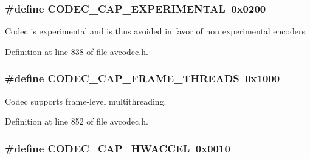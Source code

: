 \subsubsection[{\texorpdfstring{C\+O\+D\+E\+C\+\_\+\+C\+A\+P\+\_\+\+E\+X\+P\+E\+R\+I\+M\+E\+N\+T\+AL}{CODEC_CAP_EXPERIMENTAL}}]{\setlength{\rightskip}{0pt plus 5cm}\#define C\+O\+D\+E\+C\+\_\+\+C\+A\+P\+\_\+\+E\+X\+P\+E\+R\+I\+M\+E\+N\+T\+AL~0x0200}\hypertarget{group__lavc__core_ga4d8340893edcdf15fc859f8c6291db1e}{}\label{group__lavc__core_ga4d8340893edcdf15fc859f8c6291db1e}
Codec is experimental and is thus avoided in favor of non experimental encoders 

Definition at line 838 of file avcodec.\+h.

\subsubsection[{\texorpdfstring{C\+O\+D\+E\+C\+\_\+\+C\+A\+P\+\_\+\+F\+R\+A\+M\+E\+\_\+\+T\+H\+R\+E\+A\+DS}{CODEC_CAP_FRAME_THREADS}}]{\setlength{\rightskip}{0pt plus 5cm}\#define C\+O\+D\+E\+C\+\_\+\+C\+A\+P\+\_\+\+F\+R\+A\+M\+E\+\_\+\+T\+H\+R\+E\+A\+DS~0x1000}\hypertarget{group__lavc__core_gaf7d97232f50d2c3aeb4bde978407f2da}{}\label{group__lavc__core_gaf7d97232f50d2c3aeb4bde978407f2da}
Codec supports frame-\/level multithreading. 

Definition at line 852 of file avcodec.\+h.

\subsubsection[{\texorpdfstring{C\+O\+D\+E\+C\+\_\+\+C\+A\+P\+\_\+\+H\+W\+A\+C\+C\+EL}{CODEC_CAP_HWACCEL}}]{\setlength{\rightskip}{0pt plus 5cm}\#define C\+O\+D\+E\+C\+\_\+\+C\+A\+P\+\_\+\+H\+W\+A\+C\+C\+EL~0x0010}\hypertarget{group__lavc__core_gaf79a6a34c8728316aac5e9d10d883f33}{}\label{group__lavc__core_gaf79a6a34c8728316aac5e9d10d883f33}


